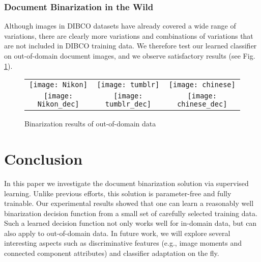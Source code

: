 \documentclass[onecolumn,11pt,draftcls,journal]{IEEEtran}
\def\fhI{4.2cm}
\begin{document}
\subsubsection{Document Binarization in the Wild }
Although images in DIBCO datasets have already covered a wide range of variations, there are clearly more variations and combinations of variations that are not included in DIBCO training data. We therefore test our learned classifier on out-of-domain document images, and we observe satisfactory results (see Fig. \ref{fig.odd}).

\begin{figure}[!h]
\centering
\begin{tabular}{c@{}c@{}c@{}}
\texttt{[image: Nikon]}&\texttt{[image: tumblr]}&\texttt{[image: chinese]}\\
\texttt{[image: Nikon\_dec]}&\texttt{[image: tumblr\_dec]}&\texttt{[image: chinese\_dec]}\\
\end{tabular}
\caption{Binarization results of out-of-domain data}
\label{fig.odd}
\end{figure}

\section{Conclusion}
In this paper we investigate the document binarization solution via supervised learning. Unlike previous efforts, this solution is parameter-free and fully trainable. Our experimental results showed that one can learn a reasonably well binarization decision function from a small set of carefully selected training data. Such a learned decision function not only works well for in-domain data, but can also apply to out-of-domain data.
In future work, we will explore several interesting aspects such as discriminative features (e.g., image moments and connected component attributes) and classifier adaptation on the fly.
\end{document}
